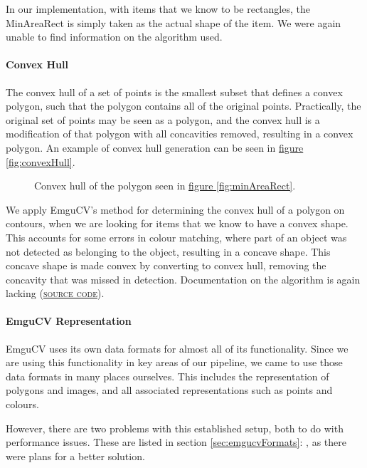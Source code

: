 \documentclass[10pt, abstracton, twocolumn]{scrartcl}
\newcommand{\fref}[1]{\hyperref[#1]{figure \vref{#1}}}
\newcommand{\sref}[1]{section \vref{#1}: \nameref{#1}}
\newcommand{\link}[2]{\textsc{\href{#1}{#2}}}
\begin{document}
In our implementation, with items that we know to be rectangles, the MinAreaRect is simply taken as the actual shape of the item. We were again unable to find information on the algorithm used.

\paragraph{Convex Hull}
The convex hull of a set of points is the smallest subset that defines a convex polygon, such that the polygon contains all of the original points. Practically, the original set of points may be seen as a polygon, and the convex hull is a modification of that polygon with all concavities removed, resulting in a convex polygon. An example of convex hull generation can be seen in \fref{fig:convexHull}.

\begin{figure}
        \centering
        
        \caption{\small Convex hull of the polygon seen in \fref{fig:minAreaRect}.}
        \label{fig:convexHull}
\end{figure}

We apply EmguCV's method for determining the convex hull of a polygon on contours, when we are looking for items that we know to have a convex shape. This accounts for some errors in colour matching, where part of an object was not detected as belonging to the object, resulting in a concave shape. This concave shape is made convex by converting to convex hull, removing the concavity that was missed in detection. Documentation on the algorithm is again lacking (\link{https://github.com/Itseez/opencv/blob/ef91d7e8830c36785f0b6fdbf2045da48413dd76/modules/imgproc/src/convhull.cpp\#L129}{source code}).

\paragraph{EmguCV Representation}
EmguCV uses its own data formats for almost all of its functionality. Since we are using this functionality in key areas of our pipeline, we came to use those data formats in many places ourselves. This includes the representation of polygons and images, and all associated representations such as points and colours.

However, there are two problems with this established setup, both to do with performance issues. These are listed in \sref{sec:emgucvFormats}, as there were plans for a better solution.
\end{document}

